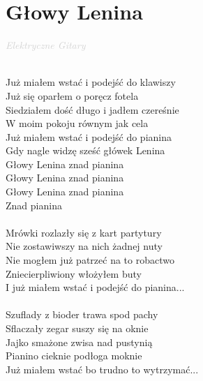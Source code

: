 \documentclass[a5paper, 10pt]{book}
\begin{document}
\newpage
\section{Głowy Lenina}\textcolor{lightgray}{\textit{Elektryczne Gitary}}\\~\\
\begin{minipage}[t]{0.6\textwidth}
  Już miałem wstać i podejść do klawiszy\\
  Już się oparłem o poręcz fotela\\
  Siedziałem dość długo i jadłem czereśnie\\
  W moim pokoju równym jak cela\\

  \hspace*{5mm}Już miałem wstać i podejść do pianina\\
  \hspace*{5mm}Gdy nagle widzę sześć główek Lenina\\
  \hspace*{5mm}Głowy Lenina znad pianina\\
  \hspace*{5mm}Głowy Lenina znad pianina\\
  \hspace*{5mm}Głowy Lenina znad pianina\\
  \hspace*{5mm}Znad pianina\\
  \\
  Mrówki rozlazły się z kart partytury\\
  Nie zostawiwszy na nich żadnej nuty\\
  Nie mogłem już patrzeć na to robactwo\\
  Zniecierpliwiony włożyłem buty\\

  \hspace*{5mm}I już miałem wstać i podejść do pianina...\\
  \\
  Szuflady z bioder trawa spod pachy\\
  Sflaczały zegar suszy się na oknie\\
  Jajko smażone zwisa nad pustynią\\
  Pianino cieknie podłoga moknie\\

  \hspace*{5mm}Już miałem wstać bo trudno to wytrzymać...\\
\end{minipage}
\end{document}
